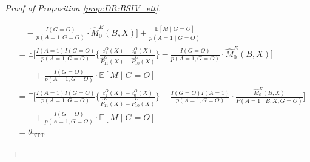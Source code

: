 \documentclass[10pt]{article}
\newcommand{\E}{\mathbb{E}}
\begin{document}
\begin{proof}[Proof of Proposition \ref{prop:DR:BSIV_ett}]
\begin{itemize}
{\begin{align*}
&\quad-\frac{I(G=O)}{p(A=1,G=O)}\cdot \hat{M}_{0}^{E}(B,X)\Big]+\frac{\mathbb{E}[M\mid G=O]}{p(A=1\mid G=O)}\\
&=\E\Big[\frac{I(A=1)I(G=O)}{p(A=1,G=O)}\Big\{\frac{e_1^O(X)-e_0^O(X)}{\hat{P}_{11}^O(X)-\hat{P}_{10}^O(X)}\Big\}-\frac{I(G=O)}{p(A=1,G=O)}\cdot \hat{M}_{0}^{E}(B,X)\Big]\\
&\quad\quad+\frac{I(G=O)}{p(A=1,G=O)}\cdot \mathbb{E}[M\mid G=O]\\
&=\E\Big[\frac{I(A=1)I(G=O)}{p(A=1,G=O)}\Big\{\frac{e_1^O(X)-e_0^O(X)}{\hat{P}_{11}^O(X)-\hat{P}_{10}^O(X)}\Big\}-\frac{I(G=O)I(A=1)}{p(A=1,G=O)}\cdot\frac{\hat{M}_{0}^{E}(B,X)}{P(A=1\mid B,X,G=O)}\Big]\\
&\quad\quad+\frac{I(G=O)}{p(A=1,G=O)}\cdot \mathbb{E}[M\mid G=O]\\
&=\theta_{\text{ETT}}
\end{align*}}
\endgroup


\end{itemize}
\end{proof}
\end{document}
